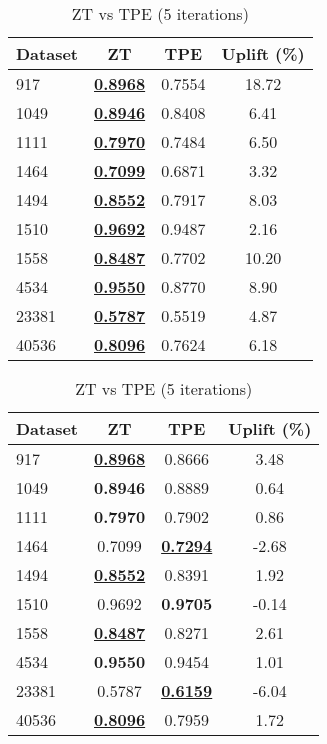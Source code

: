 \begin{table}[htbp]
\begin{center}
\begin{small}
\begin{sc}
\begin{subtable}[t]{0.48\textwidth}
    \centering
    \caption{ZT vs TPE (1 iteration)}
    \label{tab:decisiontree-zt-vs-tpe-1}
    \begin{tabular}{lccc}
    \toprule
    \textbf{Dataset} & \textbf{ZT} & \textbf{TPE} & \textbf{Uplift (\%)} \\
    \midrule
    917    & \underline{\textbf{0.8968}} & 0.7554 & 18.72 \\
    1049    & \underline{\textbf{0.8946}} & 0.8408 & 6.41 \\
    1111    & \underline{\textbf{0.7970}} & 0.7484 & 6.50 \\
    1464    & \underline{\textbf{0.7099}} & 0.6871 & 3.32 \\
    1494    & \underline{\textbf{0.8552}} & 0.7917 & 8.03 \\
    1510    & \underline{\textbf{0.9692}} & 0.9487 & 2.16 \\
    1558    & \underline{\textbf{0.8487}} & 0.7702 & 10.20 \\
    4534    & \underline{\textbf{0.9550}} & 0.8770 & 8.90 \\
    23381    & \underline{\textbf{0.5787}} & 0.5519 & 4.87 \\
    40536    & \underline{\textbf{0.8096}} & 0.7624 & 6.18 \\
    \bottomrule
    \end{tabular}
\end{subtable}
\hfill
\begin{subtable}[t]{0.48\textwidth}
    \centering
    \caption{ZT vs TPE (5 iterations)}
    \label{tab:decisiontree-zt-vs-tpe-5}
    \begin{tabular}{lccc}
    \toprule
    \textbf{Dataset} & \textbf{ZT} & \textbf{TPE} & \textbf{Uplift (\%)} \\
    \midrule
    917    & \underline{\textbf{0.8968}} & 0.8666 & 3.48 \\
    1049    & \textbf{0.8946} & 0.8889 & 0.64 \\
    1111    & \textbf{0.7970} & 0.7902 & 0.86 \\
    1464    & 0.7099 & \underline{\textbf{0.7294}} & -2.68 \\
    1494    & \underline{\textbf{0.8552}} & 0.8391 & 1.92 \\
    1510    & 0.9692 & \textbf{0.9705} & -0.14 \\
    1558    & \underline{\textbf{0.8487}} & 0.8271 & 2.61 \\
    4534    & \textbf{0.9550} & 0.9454 & 1.01 \\
    23381    & 0.5787 & \underline{\textbf{0.6159}} & -6.04 \\
    40536    & \underline{\textbf{0.8096}} & 0.7959 & 1.72 \\
    \bottomrule
    \end{tabular}
\end{subtable}


\end{sc}
\end{small}
\end{center}
\end{table}
